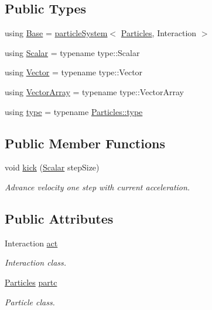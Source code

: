 \subsection*{Public Types}
\begin{DoxyCompactItemize}
\item 
using \mbox{\hyperlink{class_a_rchain_a59c554d5529dc8d1558eb263699bfa24}{Base}} = \mbox{\hyperlink{classparticle_system}{particle\+System}}$<$ \mbox{\hyperlink{struct_particles}{Particles}}, Interaction $>$
\item 
using \mbox{\hyperlink{class_a_rchain_a048c8855064f452c7d6d061531a084ed}{Scalar}} = typename type\+::\+Scalar
\item 
using \mbox{\hyperlink{class_a_rchain_a985f967708536cea258613bcc1147c78}{Vector}} = typename type\+::\+Vector
\item 
using \mbox{\hyperlink{class_a_rchain_a94de7c4b88207f08c7b517736385d9f2}{Vector\+Array}} = typename type\+::\+Vector\+Array
\item 
using \mbox{\hyperlink{class_a_rchain_a7919ed2c8b419f26da20a3bd43ba5fcd}{type}} = typename \mbox{\hyperlink{class_vel_indep_particles_a0c62b43c2f0a50565e5e06587fddee18}{Particles\+::type}}
\end{DoxyCompactItemize}
\subsection*{Public Member Functions}
\begin{DoxyCompactItemize}
\item 
void \mbox{\hyperlink{class_a_rchain_a2def151c2de7790ebb1696dddac623e3}{kick}} (\mbox{\hyperlink{class_a_rchain_a048c8855064f452c7d6d061531a084ed}{Scalar}} step\+Size)
\begin{DoxyCompactList}\small\item\em Advance velocity one step with current acceleration. \end{DoxyCompactList}\end{DoxyCompactItemize}
\subsection*{Public Attributes}
\begin{DoxyCompactItemize}
\item 
Interaction \mbox{\hyperlink{class_a_rchain_a41e5c73bc46164302db25b5c5d28aedd}{act}}
\begin{DoxyCompactList}\small\item\em Interaction class. \end{DoxyCompactList}\item 
\mbox{\hyperlink{struct_particles}{Particles}} \mbox{\hyperlink{class_a_rchain_a48cb24fbd9d72503a5e464a02760e814}{partc}}
\begin{DoxyCompactList}\small\item\em Particle class. \end{DoxyCompactList}\end{DoxyCompactItemize}
